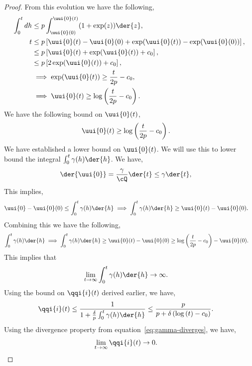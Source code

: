 \documentclass{article}
\theoremstyle{plain}
\theoremstyle{definition}
\theoremstyle{remark}
\begin{document}
\begin{proof}
From this evolution we have the following, 
\begin{align*}
    \int_{0}^{t} d h &\leq p \int_{\uui{0}(0)}^{\uui{0}(t)} (1 + \exp(z)) \der{z}, \\
    t &\leq p \left[ \uui{0}(t) - \uui{0}(0) + \exp(\uui{0}(t)) - \exp(\uui{0}(0)) \right], \\
    &\leq p \left[ \uui{0}(t) + \exp(\uui{0}(t)) + c_0 \right], \\
    &\leq p \left[ 2 \exp(\uui{0}(t)) + c_0 \right], \\
    &\implies \exp(\uui{0}(t)) \geq \frac{t}{2p} - c_0, \\
    &\implies \uui{0}(t) \geq \log\left(  \frac{t}{2p} - c_0  \right).
\end{align*}
We have the following bound on $\uui{0}(t)$,
\begin{align} \label{eq:u0-bound}
    \uui{0}(t) &\geq \log\left(  \frac{t}{2p} - c_0  \right).
\end{align}
We have established a lower bound on $\uui{0}(t)$. We will use this to lower bound the integral $\int_{0}^{t} \gamma(h) \der{h}$. We have, 
\begin{align*}
\der{\uui{0}} &= \frac{\gamma}{\cQ} \der{t} \leq \gamma \der{t}, 
\end{align*}
This implies,
\begin{align*}
 \uui{0} - \uui{0}(0) \leq \int_{0}^{t} \gamma(h) \der{h} &\implies \int_{0}^{t} \gamma(h) \der{h} \geq \uui{0}(t) - \uui{0}(0).
\end{align*}
Combining this we have the following, 
\begin{align} \label{eq:gamma-t-bound}
\int_{0}^{t} \gamma(h) \der{h} &\implies \int_{0}^{t} \gamma(h) \der{h} \geq \uui{0}(t) - \uui{0}(0) \geq \log\left(  \frac{t}{2p} - c_0  \right) - \uui{0}(0).
\end{align}
This implies that 
\begin{align}\label{eq:gamma-diverges}
    \lim_{t \to \infty} \int_{0}^{t} \gamma(h) \der{h} &\to \infty.
\end{align}
Using the bound on $\qqi{i}(t)$ derived earlier, we have,
\begin{align*}
    \qqi{i}(t) &\leq \frac{1}{1 + \frac{\delta}{p} \int_{0}^{t} \gamma(h) \der{h}} \leq \frac{p}{p + \delta \left( \log\left( t\right) - c_0  \right)}.
\end{align*}
Using the divergence property from equation~\eqref{eq:gamma-diverges}, we have,
\begin{align*}
    \lim_{t \to \infty} \qqi{i}(t) &\to 0.
\end{align*}


\end{proof}
\end{document}
